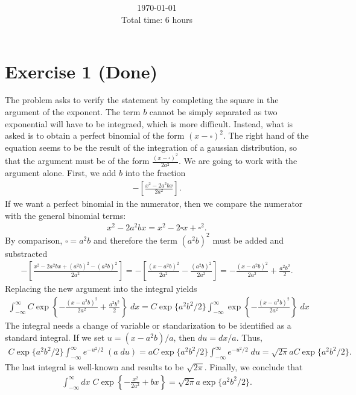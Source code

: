 \documentclass[letterpaper,11pt,twoside]{article}
\title{\textbf{\assignment}\\\course\\{\Large\institution}}
\author{\autor}
\date{\today\\Total time: 6 hours}
\begin{document}
\pagestyle{mainstyle}
\maketitle
\section{Exercise 1 (Done)}%
The problem asks to verify the statement by completing the square in the argument of the exponent. The term $b$ cannot be simply separated as two
exponential will have to be integraed, which is more difficult. Instead, what is asked is to obtain a perfect binomial of the form $(x-\square)^2$.
The right hand of the equation seems to be the result of the integration of a gaussian distribution, so that the argument must be of the form $\frac{(x-\square)^2}{2a^2}$.
We are going to work with the argument alone. First, we add $b$ into the fraction
\begin{align*}
  -\left[\frac{x^2-2a^2bx}{2a^2}\right].
\end{align*}
If we want a perfect binomial in the numerator, then we compare the numerator with the general binomial terms:
\begin{align}
  x^2-2a^2bx = x^2-2\square x+\square^2.
\end{align}
By comparison, $\square=a^2b$ and therefore the term $(a^2b)^2$ must be added and substracted
\begin{align*}
  -\left[\frac{x^2-2a^2bx+(a^2b)^2-(a^2b)^2}{2a^2}\right]=-\left[\frac{(x-a^2b)^2}{2a^2}-\frac{(a^2b)^2}{2a^2}\right]=-\frac{(x-a^2b)^2}{2a^2}+\frac{a^2b^2}{2}.
\end{align*}
Replacing the new argument into the integral yields
\begin{align*}
  \int_{-\infty}^\infty C\exp\left\{-\frac{(x-a^2b)^2}{2a^2}+\frac{a^2b^2}{2}\right\}\;dx=C\exp\{a^2b^2/2\}\int_{-\infty}^\infty\exp\left\{-\frac{(x-a^2b)^2}{2a^2}\right\}\;dx
\end{align*}
The integral needs a change of variable or standarization to be identified as a standard integral. If we set $u=(x-a^2b)/a$, then $du=dx/a$. Thus,
\begin{align*}
  C\exp\{a^2b^2/2\}\int_{-\infty}^\infty e^{-u^2/2}\;\left(a\;du\right)=aC\exp\{a^2b^2/2\}\int_{-\infty}^\infty e^{-u^2/2}\;du=\sqrt{2\pi}aC\exp\{a^2b^2/2\}.
\end{align*}
The last integral is well-known and results to be $\sqrt{2\pi}$. Finally, we conclude that 
\begin{align}
  \int_{-\infty}^\infty dx\;C\exp\left\{-\frac{x^2}{2a^2}+bx\right\}=\sqrt{2\pi}a\exp\{a^2b^2/2\}.
\end{align}
\end{document}
